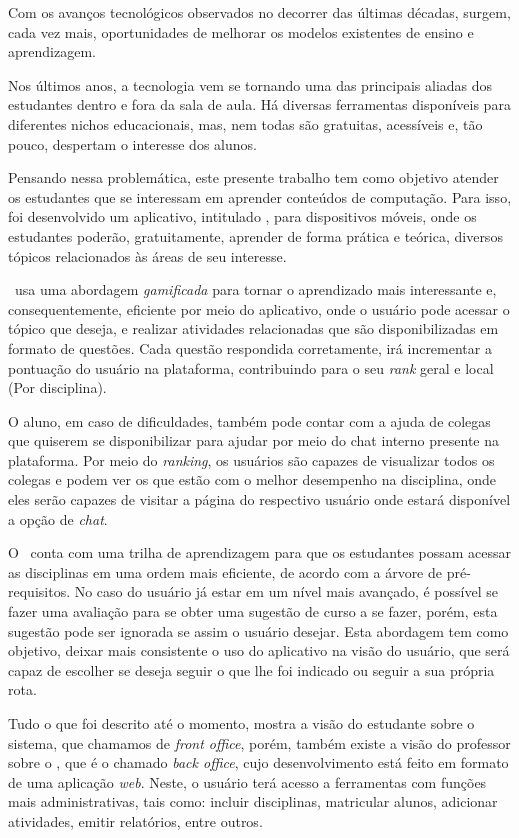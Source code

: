 Com os avanços tecnológicos observados no decorrer das últimas décadas, surgem, cada vez mais, oportunidades de melhorar os modelos existentes de ensino e aprendizagem.

Nos últimos anos, a tecnologia vem se tornando uma das principais aliadas dos estudantes dentro e fora da sala de aula. Há diversas ferramentas disponíveis para diferentes nichos educacionais, mas, nem todas são gratuitas, acessíveis e, tão pouco, despertam o interesse dos alunos.

Pensando nessa problemática, este presente trabalho tem como objetivo atender os estudantes que se interessam em aprender conteúdos de computação. Para isso, foi desenvolvido um aplicativo, intitulado \appName, para dispositivos móveis, onde os estudantes poderão, gratuitamente, aprender de forma prática e teórica, diversos tópicos relacionados às áreas de seu interesse.

\appName\ usa uma abordagem \textit{gamificada} para tornar o aprendizado mais interessante e, consequentemente, eficiente por meio do aplicativo, onde o usuário pode acessar o tópico que deseja, e realizar atividades relacionadas que são disponibilizadas em formato de questões. Cada questão respondida corretamente, irá incrementar a pontuação do usuário na plataforma, contribuindo para o seu \textit{rank} geral e local (Por disciplina).

O aluno, em caso de dificuldades, também pode contar com a ajuda de colegas que quiserem se disponibilizar para ajudar por meio do chat interno presente na plataforma. Por meio do \textit{ranking}, os usuários são capazes de visualizar todos os colegas e podem ver os que estão com o melhor desempenho na disciplina, onde eles serão capazes de visitar a página do respectivo usuário onde estará disponível a opção de \textit{chat}.

O \appName\ conta com uma trilha de aprendizagem para que os estudantes possam acessar as disciplinas em uma ordem mais eficiente, de acordo com a árvore de pré-requisitos. No caso do usuário já estar em um nível mais avançado, é possível se fazer uma avaliação para se obter uma sugestão de curso a se fazer, porém, esta sugestão pode ser ignorada se assim o usuário desejar. Esta abordagem tem como objetivo, deixar mais consistente o uso do aplicativo na visão do usuário, que será capaz de escolher se deseja seguir o que lhe foi indicado ou seguir a sua própria rota.

Tudo o que foi descrito até o momento, mostra a visão do estudante sobre o sistema, que chamamos de \textit{front office}, porém, também existe a visão do professor sobre o \appName, que é o chamado \textit{back office}, cujo desenvolvimento está feito em formato de uma aplicação \textit{web}. Neste, o usuário terá acesso a ferramentas com funções mais administrativas, tais como: incluir disciplinas, matricular alunos, adicionar atividades, emitir relatórios, entre outros.
